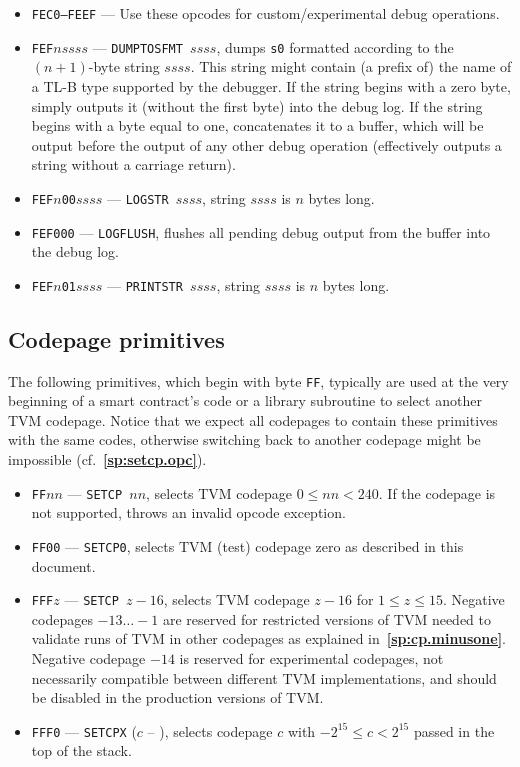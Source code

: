 \documentclass[12pt,oneside]{article}
\def\refpoint#1{{\rm\textbf{\ref{#1}}}}
\let\ptref=\refpoint
\def\mysubsection#1{

    \subsection{#1}\fancyhead[C]{\small{\textsc{\textrm{\thesubsection.} #1}}}}
\begin{document}
\begin{itemize}
\item {\tt FEC0--FEEF} --- Use these opcodes for custom/experimental debug operations.
\item {\tt FEF$nssss$} --- {\tt DUMPTOSFMT $ssss$}, dumps {\tt s0} formatted according to the $(n+1)$-byte string $ssss$. This string might contain (a prefix of) the name of a TL-B type supported by the debugger. If the string begins with a zero byte, simply outputs it (without the first byte) into the debug log. If the string begins with a byte equal to one, concatenates it to a buffer, which will be output before the output of any other debug operation (effectively outputs a string without a carriage return).
\item {\tt FEF$n$00$ssss$} --- {\tt LOGSTR $ssss$}, string $ssss$ is $n$ bytes long.
\item {\tt FEF000} --- {\tt LOGFLUSH}, flushes all pending debug output from the buffer into the debug log.
\item {\tt FEF$n$01$ssss$} --- {\tt PRINTSTR $ssss$}, string $ssss$ is $n$ bytes long.
\end{itemize}

\mysubsection{Codepage primitives}\label{p:prim.codepage}
The following primitives, which begin with byte {\tt FF}, typically are used at the very beginning of a smart contract's code or a library subroutine to select another TVM codepage. Notice that we expect all codepages to contain these primitives with the same codes, otherwise switching back to another codepage might be impossible (cf.~\ptref{sp:setcp.opc}).
\begin{itemize}
\item {\tt FF$nn$} --- {\tt SETCP $nn$}, selects TVM codepage $0\leq nn<240$. If the codepage is not supported, throws an invalid opcode exception.
\item {\tt FF00} --- {\tt SETCP0}, selects TVM (test) codepage zero as described in this document.
\item {\tt FFF$z$} --- {\tt SETCP $z-16$}, selects TVM codepage $z-16$ for $1\leq z\leq 15$. Negative codepages $-13\ldots-1$ are reserved for restricted versions of TVM needed to validate runs of TVM in other codepages as explained in~\ptref{sp:cp.minusone}. Negative codepage $-14$ is reserved for experimental codepages, not necessarily compatible between different TVM implementations, and should be disabled in the production versions of TVM.
\item {\tt FFF0} --- {\tt SETCPX} ($c$ -- ), selects codepage $c$ with $-2^{15}\leq c<2^{15}$ passed in the top of the stack.
\end{itemize}
\end{document}
